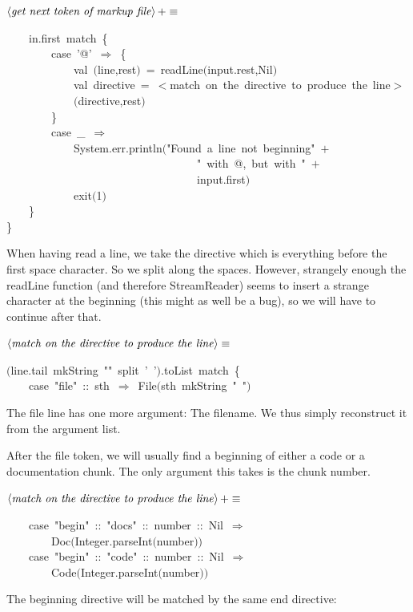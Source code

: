 \documentclass[a4paper,12pt]{article}
\begin{document}
$\left<\mbox{\emph{get next token of markup file}}\right>+\equiv$
\begin{program}~~~~in.first~{\vem match}~{\small\{}
\\~~~~~~~~{\vem case}~'@'~$\Rightarrow$~{\small\{}
\\~~~~~~~~~~~~{\vem val}~$($line,rest$)$~=~readLine$($input.rest,Nil$)$
\\~~~~~~~~~~~~{\vem val}~directive~=~$<${\vem match}~on~the~directive~to~produce~the~line$>$
\\~~~~~~~~~~~~$($directive,rest$)$
\\~~~~~~~~{\small\}}
\\~~~~~~~~{\vem case}~\_~$\Rightarrow$
\\~~~~~~~~~~~~System.err.println$($"Found~a~line~not~beginning"~$+$
\\~~~~~~~~~~~~~~~~~~~~~~~~~~~~~~~~~~"~{\vem with}~@,~but~{\vem with}~"~$+$
\\~~~~~~~~~~~~~~~~~~~~~~~~~~~~~~~~~~input.first$)$
\\~~~~~~~~~~~~exit$($1$)$
\\~~~~{\small\}}
\\{\small\}}
\\[0.5em]\end{program}
When having read a line, we take the directive which is everything before
the first space character. So we split along the spaces. However, strangely
enough the readLine function (and therefore StreamReader) seems to insert
a strange character at the beginning (this might as well be a bug), so we will
have to continue after that.

$\left<\mbox{\emph{match on the directive to produce the line}}\right>\equiv$
\begin{program}$($line.tail~mkString~""~split~'~'$)$.toList~{\vem match}~{\small\{}
\\~~~~{\vem case}~"file"~{\rm :}{\rm :}~sth~$\Rightarrow$~File$($sth~mkString~"~"$)$
\\[0.5em]\end{program}
The file line has one more argument: The filename. We thus simply reconstruct
it from the argument list.

After the file token, we will usually find a beginning of either a code or
a documentation chunk. The only argument this takes is the chunk number.

$\left<\mbox{\emph{match on the directive to produce the line}}\right>+\equiv$
\begin{program}~~~~{\vem case}~"begin"~{\rm :}{\rm :}~"docs"~{\rm :}{\rm :}~number~{\rm :}{\rm :}~Nil~$\Rightarrow$
\\~~~~~~~~Doc$($Integer.parseInt$($number$)$$)$
\\~~~~{\vem case}~"begin"~{\rm :}{\rm :}~"code"~{\rm :}{\rm :}~number~{\rm :}{\rm :}~Nil~$\Rightarrow$
\\~~~~~~~~Code$($Integer.parseInt$($number$)$$)$
\\[0.5em]\end{program}
The beginning directive will be matched by the same end directive:
\end{document}

